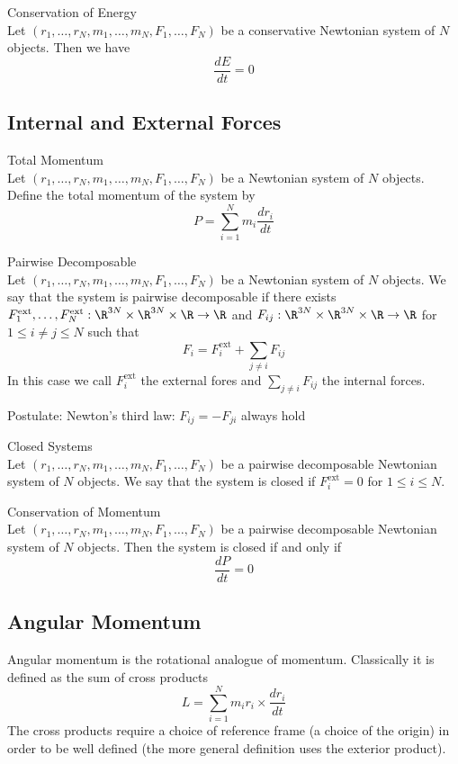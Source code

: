 \documentclass[a4paper]{article}
\begin{document}
\begin{thm}{Conservation of Energy}{}\\
Let $(r_1,\dots,r_N,m_1,\dots,m_N,F_1,\dots,F_N)$ be a conservative Newtonian system of $N$ objects. Then we have $$\frac{dE}{dt}=0$$
\end{thm}

\subsection{Internal and External Forces}
\begin{defn}{Total Momentum}{}\\
Let $(r_1,\dots,r_N,m_1,\dots,m_N,F_1,\dots,F_N)$ be a Newtonian system of $N$ objects. Define the total momentum of the system by $$P=\sum_{i=1}^Nm_i\frac{dr_i}{dt}$$
\end{defn}

\begin{defn}{Pairwise Decomposable}{}\\
Let $(r_1,\dots,r_N,m_1,\dots,m_N,F_1,\dots,F_N)$ be a Newtonian system of $N$ objects. We say that the system is pairwise decomposable if there exists $F_1^\text{ext},\dots,F_N^\text{ext}:\R^{3N}\times\R^{3N}\times\R\to\R$ and $F_{ij}:\R^{3N}\times\R^{3N}\times\R\to\R$ for $1\leq i\neq j\leq N$ such that $$F_i=F_i^\text{ext}+\sum_{j\neq i}F_{ij}$$ In this case we call $F_i^\text{ext}$ the external fores and $\sum_{j\neq i}F_{ij}$ the internal forces. 
\end{defn}

Postulate: Newton's third law: $F_{ij}=-F_{ji}$ always hold

\begin{defn}{Closed Systems}{}\\
Let $(r_1,\dots,r_N,m_1,\dots,m_N,F_1,\dots,F_N)$ be a pairwise decomposable Newtonian system of $N$ objects. We say that the system is closed if $F_i^\text{ext}=0$ for $1\leq i\leq N$. 
\end{defn}

\begin{thm}{Conservation of Momentum}{}\\
Let $(r_1,\dots,r_N,m_1,\dots,m_N,F_1,\dots,F_N)$ be a pairwise decomposable Newtonian system of $N$ objects. Then the system is closed if and only if $$\frac{dP}{dt}=0$$
\end{thm}

\subsection{Angular Momentum}
Angular momentum is the rotational analogue of momentum. Classically it is defined as the sum of cross products $$L=\sum_{i=1}^Nm_ir_i\times\frac{dr_i}{dt}$$ The cross products require a choice of reference frame (a choice of the origin) in order to be well defined (the more general definition uses the exterior product). 
\end{document}
